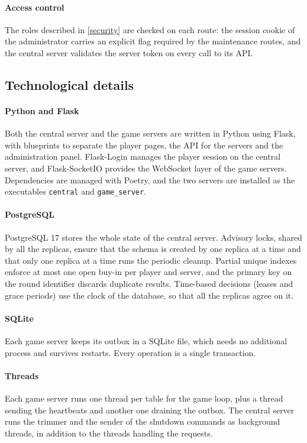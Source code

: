 \documentclass{scrartcl}
\begin{document}
\paragraph{Access control}
The roles described in \cref{security} are checked on each route: the session cookie of the administrator carries an
explicit flag required by the maintenance routes, and the central server validates the server token on every call to its API.

\subsection{Technological details}\label{technological-details}

\paragraph{Python and Flask}
Both the central server and the game servers are written in Python using Flask, with blueprints to separate the player pages, 
the API for the servers and the administration panel.
Flask-Login manages the player session on the central server, and Flask-SocketIO provides the WebSocket layer of the game servers.
Dependencies are managed with Poetry, and the two servers are installed as the executables \texttt{central} and \texttt{game\_server}.

\paragraph{PostgreSQL}
PostgreSQL 17 stores the whole state of the central server.
Advisory locks, shared by all the replicas, ensure that the schema is created by one replica at a time and that only one replica at a time runs the periodic cleanup.
Partial unique indexes enforce at most one open buy-in per player and server, and the primary key on the round identifier discards duplicate results.
Time-based decisions (leases and grace periods) use the clock of the database, so that all the replicas agree on it.

\paragraph{SQLite}
Each game server keeps its outbox in a SQLite file, which needs no additional process and survives restarts.
Every operation is a single transaction.

\paragraph{Threads}
Each game server runs one thread per table for the game loop, plus a thread sending the heartbeats and another one draining the outbox.
The central server runs the trimmer and the sender of the shutdown commands as background threads, in addition to the threads handling the requests.
\end{document}
